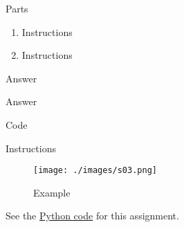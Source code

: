 


%
%

\newcommand{\hmwkTitle}{HW00}
\newcommand{\hmwkSubTitle}{Homework Template}
\newcommand{\hmwkDueDate}{September 25th. 2025}
\newcommand{\hmwkDueTime}{09:30 AM}
\newcommand{\hmwkClass}{ENAE 441 - 0101}
\newcommand{\hmwkClassTime}{09:30 AM}
\newcommand{\hmwkClassInstructor}{Dr. Martin}
\newcommand{\hmwkAuthorName}{\textbf{Vai Srivastava}}
\newcommand{\hmwkCompletionDate}{\today}



\maketitle

\pagebreak

\begin{hwkProblem}{1}{Parts} \label{hwk:p01}

	\begin{enumerate}
		\item \label{hwk:p01a} Instructions
		\item \label{hwk:p01b} Instructions
	\end{enumerate}

	\hwkSol{} \label{hwk:s01}

	\hwkPart{} \label{hwk:s01a}

	Answer

	\hwkPart{} \label{hwk:s01b}

	Answer

\end{hwkProblem}

\begin{hwkProblem}{2}{Code} \label{hwk:p02}

	Instructions

	\hwkSol{} \label{hwk:s02}

	\begin{figure}[H] \label{fig:s03}
		\begin{center}
			\texttt{[image: ./images/s03.png]}
		\end{center}
		\caption{Example}
	\end{figure}

	\hwkCode{} \label{code:s02}

	See the \href{https://www.github.com/vaisriv/enae441-hw-template/blob/main/code/hw00.py}{Python code} for this assignment.

\end{hwkProblem}


